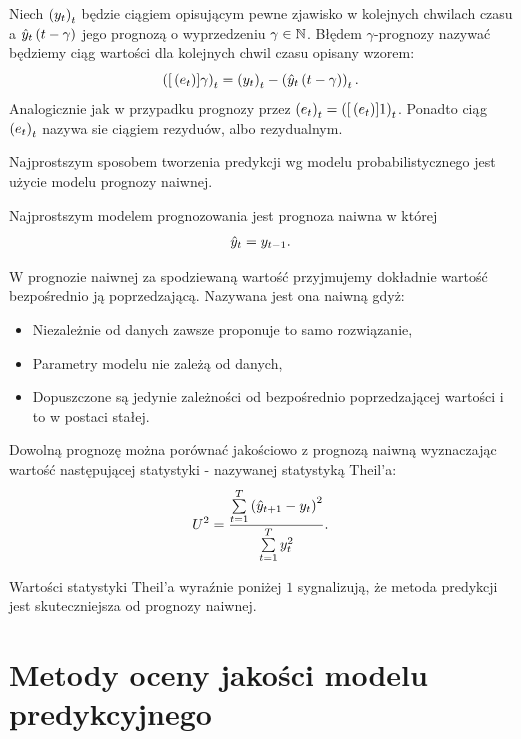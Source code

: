 \documentclass[10pt,a4paper]{book}
\begin{document}
\begin{definition}
Niech $\left( {y_t} \right)_{t}^{} $ będzie ciągiem opisującym pewne zjawisko w kolejnych chwilach czasu a $\predict[t-\gamma]{y}{t}$ jego prognozą o wyprzedzeniu $\gamma \in \mathbb{N}$. Błędem $\gamma$-prognozy nazywać będziemy ciąg wartości dla kolejnych chwil czasu opisany wzorem:
$$
\sequence{\function[{e_t}]{\gamma}}{t}{} = \sequence{y_t}{t}{} - \sequence{\predict[t-\gamma]{y}{t}}{t}{}.
$$
Analogicznie jak w przypadku prognozy przez $\left( {e_t} \right)_{t}^{} = \left( {{{[}\left( {e_t} \right)}]{1} } \right)_{t}^{} $. Ponadto ciąg $\left( {e_t} \right)_{t}^{} $ nazywa sie ciągiem rezyduów, albo rezydualnym.
\end{definition}

Najprostszym sposobem tworzenia predykcji wg modelu probabilistycznego jest użycie modelu prognozy naiwnej.

\begin{definition}
Najprostszym modelem prognozowania jest prognoza naiwna w której
$$
\predict{y}{t} = y_{t-1}.
$$
\end{definition}


W prognozie naiwnej za spodziewaną wartość przyjmujemy dokładnie wartość bezpośrednio ją poprzedzającą. Nazywana jest ona naiwną gdyż:
\begin{itemize}
\item Niezależnie od danych zawsze proponuje to samo rozwiązanie,
\item Parametry modelu nie zależą od danych,
\item Dopuszczone są jedynie zależności od bezpośrednio poprzedzającej wartości i to w postaci stałej.
\end{itemize}

\begin{definition}
Dowolną prognozę można porównać jakościowo z prognozą naiwną wyznaczając wartość następującej statystyki - nazywanej statystyką Theil'a:
$$
U^2 = \frac{\sum_{t = 1}^{T} \bracket{\predict{y}{t+1} - y_t }^2}{\sum_{t=1}^{T} y_t^2}.
$$
\end{definition}
Wartości statystyki Theil'a wyraźnie poniżej $1$ sygnalizują, że metoda predykcji jest skuteczniejsza od prognozy naiwnej.

\section{Metody oceny jakości modelu predykcyjnego}
\end{document}
